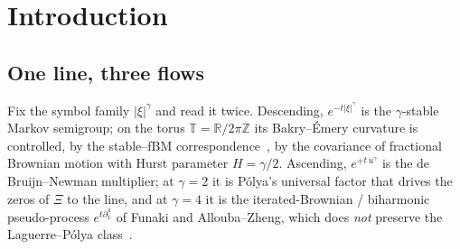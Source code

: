 \documentclass[11pt,reqno]{amsart}
\theoremstyle{plain}
\theoremstyle{definition}
\theoremstyle{remark}
\newcommand{\R}{\mathbb R}
\newcommand{\Z}{\mathbb Z}
\newcommand{\T}{\mathbb T}
\newcommand{\LP}{\mathcal{LP}}
\begin{document}
\begin{abstract}
At the iterated-Brownian endpoint $H=2$ ($\gamma=4$) the base kernel
$\Psi_4$ is a rank-three form of signature $(1,2)$, the curvature shadow
of the Laguerre--P\'olya non-preservation of $e^{t\partial_x^4}$. Where
curvature meets real-rootedness we make precise through a
total-positivity dictionary: among even orders, the kernel is positive
$\Leftrightarrow$ the flow preserves $\LP$ $\Leftrightarrow$ heat, and the
curvature spectral zeta at $j=2$ is the Riemann zeta itself,
$\sum_k(2k-1)^{-s}=(1-2^{-s})\zeta(s)$. The signature also drives the quartic
de Bruijn--Newman constant $\Lambda(4)$, which we resolve by GPU
computation: the re-coherence time of a drowned pair is independent of both
gap and height (measured exponent $\beta\approx0$ over a decade of gap and
$x$ to $6000$), because it is set by the detachment of the saddle of
$g(u)=tu^4+\log\Phi(u)$ at $u_*=\tfrac34$, $t_*=\tfrac{64}{27}\pi e^3\approx
150$---a phase with no $x$ in it, so height-blind. Every drowned pair, to
height $x\approx10^4$ far past the window, is extinguished at this scale,
not migrated outward; a direct scan confirms the bad set empty past
$t\approx160$. Thus $\Lambda(4)\approx155$ is \emph{finite} for the
operative mechanism both source papers debate; even the deep far field at
$\Phi$'s strip edge---the IBM open estimate, below float64---is reached in
$460$-digit arithmetic and found real-rooted at $t=300$, leaving only
uniformity in $t$ unproved. The same saddle gives $\Lambda(2m)<\infty$ at
every even order.
\end{abstract}

\maketitle

\section{Introduction}\label{sec:intro}

\subsection{One line, three flows}
Fix the symbol family $|\xi|^\gamma$ and read it twice. Descending,
$e^{-t|\xi|^\gamma}$ is the $\gamma$-stable Markov semigroup; on the
torus $\T=\R/2\pi\Z$ its Bakry--\'Emery curvature is controlled, by the
stable--fBM correspondence~\cite{FontesBE}, by the covariance of
fractional Brownian motion with Hurst parameter $H=\gamma/2$.
Ascending, $e^{+t\,u^\gamma}$ is the de Bruijn--Newman multiplier; at
$\gamma=2$ it is P\'olya's universal factor that drives the zeros of
$\Xi$ to the line, and at $\gamma=4$ it is the iterated-Brownian /
biharmonic pseudo-process $e^{t\partial_x^4}$ of Funaki and
Allouba--Zheng, which does \emph{not} preserve the Laguerre--P\'olya
class~\cite{FontesIBM}.
\end{document}
